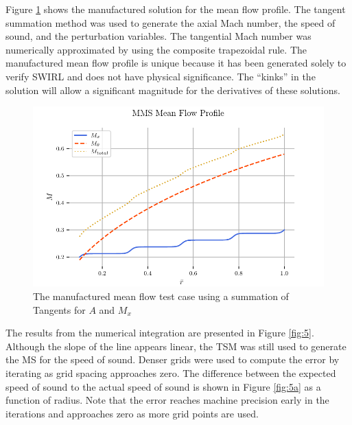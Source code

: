Figure \ref{fig:1} shows the manufactured solution for the mean flow profile. The tangent
summation method was used to generate the axial Mach number, the speed of sound, and the perturbation variables. The tangential Mach number was numerically
approximated by using the composite trapezoidal rule. The manufactured mean flow
profile is unique because it has been generated solely to verify SWIRL
and does not have physical significance. The “kinks” in the solution will allow a significant magnitude for the derivatives of these solutions.
\begin{figure}[h!]
    \centering
    \includegraphics{../../../CodeRun/04-plotReport/tex-outputs/MMS1_mean_flow_profile.pdf}
    \caption{The manufactured mean flow test case using a summation of Tangents for $A$ and $M_x$}
    \label{fig:1}
\end{figure}

The results from the numerical integration are presented in Figure \ref{fig:5}. Although
the slope of the line appears linear, the TSM was still used to generate the MS for
the speed of sound. Denser grids were used to compute the error by iterating as 
grid spacing approaches zero. The difference between the expected speed of sound
to the actual speed of sound is shown in Figure \ref{fig:5a} as a function of 
radius. Note that the error reaches machine precision early in the 
iterations and approaches zero as more grid points are used.

